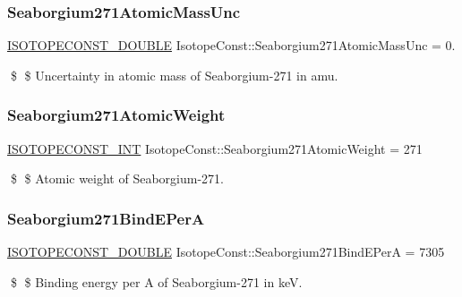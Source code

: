 \subsubsection{\texorpdfstring{Seaborgium271\+Atomic\+Mass\+Unc}{Seaborgium271AtomicMassUnc}}
{\footnotesize\ttfamily \mbox{\hyperlink{group___isotope_const-_macros_ga8f45a7272ce02c0b4c65c44636ed719a}{I\+S\+O\+T\+O\+P\+E\+C\+O\+N\+S\+T\+\_\+\+D\+O\+U\+B\+LE}} Isotope\+Const\+::\+Seaborgium271\+Atomic\+Mass\+Unc = 0.}

\$ \$ Uncertainty in atomic mass of Seaborgium-\/271 in amu. \mbox{\label{group___isotope_const-_seaborgium-_sg271_ga1c012485124bcad5e96b378ca3a3ad13}} 
\subsubsection{\texorpdfstring{Seaborgium271\+Atomic\+Weight}{Seaborgium271AtomicWeight}}
{\footnotesize\ttfamily \mbox{\hyperlink{group___isotope_const-_macros_ga5f18360b3e99483a35c32d789e62621c}{I\+S\+O\+T\+O\+P\+E\+C\+O\+N\+S\+T\+\_\+\+I\+NT}} Isotope\+Const\+::\+Seaborgium271\+Atomic\+Weight = 271}

\$ \$ Atomic weight of Seaborgium-\/271. \mbox{\label{group___isotope_const-_seaborgium-_sg271_gacdbc766dea20c322d4c5f11681e4d5e7}} 
\subsubsection{\texorpdfstring{Seaborgium271\+Bind\+E\+PerA}{Seaborgium271BindEPerA}}
{\footnotesize\ttfamily \mbox{\hyperlink{group___isotope_const-_macros_ga8f45a7272ce02c0b4c65c44636ed719a}{I\+S\+O\+T\+O\+P\+E\+C\+O\+N\+S\+T\+\_\+\+D\+O\+U\+B\+LE}} Isotope\+Const\+::\+Seaborgium271\+Bind\+E\+PerA = 7305}

\$ \$ Binding energy per A of Seaborgium-\/271 in keV. \mbox{\label{group___isotope_const-_seaborgium-_sg271_gae415bbad86a2a38197c3c2dee0838631}} 
